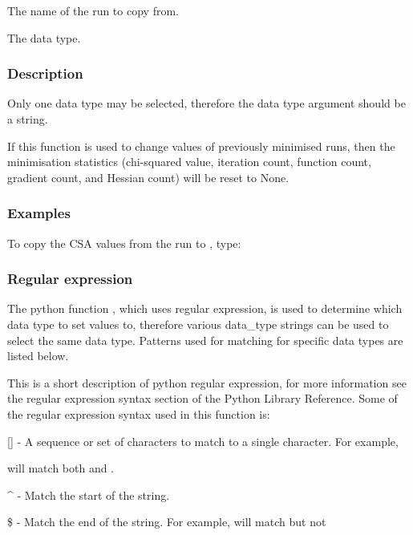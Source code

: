   The name of the run to copy from.

  The data type.

\subsubsection{Description}

Only one data type may be selected, therefore the data type argument should be a string.

If this function is used to change values of previously minimised runs, then the
minimisation statistics (chi-squared value, iteration count, function count, gradient count,
and Hessian count) will be reset to None.


\subsubsection{Examples}

To copy the CSA values from the run 
 to 
, type:






\subsubsection{Regular expression}

The python function 
, which uses regular expression, is used to determine which data
type to set values to, therefore various data\_type strings can be used to select the same
data type.  Patterns used for matching for specific data types are listed below.

This is a short description of python regular expression, for more information see the
regular expression syntax section of the Python Library Reference.  Some of the regular
expression syntax used in this function is:

    [] - A sequence or set of characters to match to a single character.  For example,
    
 will match both 
 and 
.

    \^{} - Match the start of the string.

    \$ - Match the end of the string.  For example, 
 will match 
 but not 

